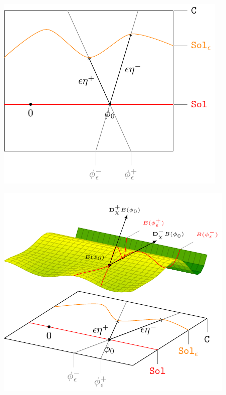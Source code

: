 \documentclass{article}
\begin{document}
	\includegraphics[width=\textwidth]{../Pictures/GeometricPicture2}
				
	\includegraphics[width=\textwidth]{../Pictures/GeometricPicture3}
				
\end{document}

